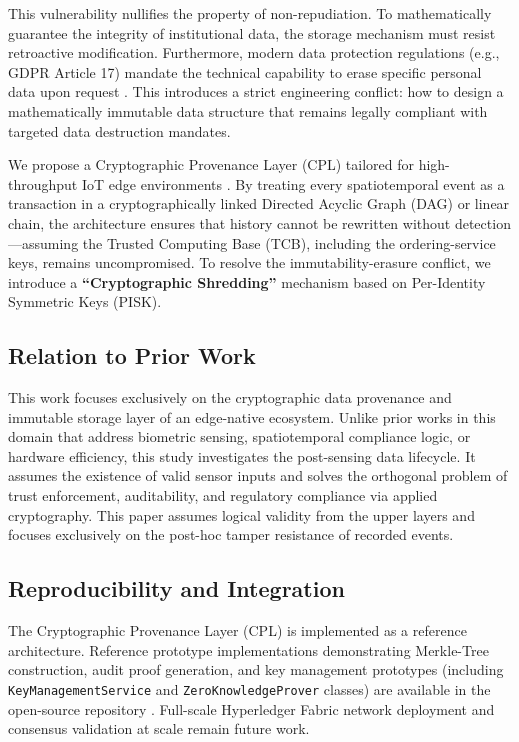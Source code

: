 \documentclass[conference]{IEEEtran}
\begin{document}
This vulnerability nullifies the property of non-repudiation. To mathematically guarantee the integrity of institutional data, the storage mechanism must resist retroactive modification. Furthermore, modern data protection regulations (e.g., GDPR Article 17) mandate the technical capability to erase specific personal data upon request \cite{b23, b9}. This introduces a strict engineering conflict: how to design a mathematically immutable data structure that remains legally compliant with targeted data destruction mandates.

We propose a Cryptographic Provenance Layer (CPL) tailored for high-throughput IoT edge environments \cite{b20, b21}. By treating every spatiotemporal event as a transaction in a cryptographically linked Directed Acyclic Graph (DAG) or linear chain, the architecture ensures that history cannot be rewritten without detection---assuming the Trusted Computing Base (TCB), including the ordering-service keys, remains uncompromised. To resolve the immutability-erasure conflict, we introduce a \textbf{``Cryptographic Shredding''} mechanism based on Per-Identity Symmetric Keys (PISK). 

\subsection{Relation to Prior Work}
This work focuses exclusively on the cryptographic data provenance and immutable storage layer of an edge-native ecosystem. Unlike prior works in this domain that address biometric sensing, spatiotemporal compliance logic, or hardware efficiency, this study investigates the post-sensing data lifecycle. It assumes the existence of valid sensor inputs and solves the orthogonal problem of trust enforcement, auditability, and regulatory compliance via applied cryptography. This paper assumes logical validity from the upper layers and focuses exclusively on the post-hoc tamper resistance of recorded events.

\subsection{Reproducibility and Integration}
The Cryptographic Provenance Layer (CPL) is implemented as a reference architecture. Reference prototype implementations demonstrating Merkle-Tree construction, audit proof generation, and key management prototypes (including \texttt{KeyManagementService} and \texttt{ZeroKnowledgeProver} classes) are available in the open-source repository \cite{scholarmaster_repo}. Full-scale Hyperledger Fabric network deployment and consensus validation at scale remain future work.
\end{document}
